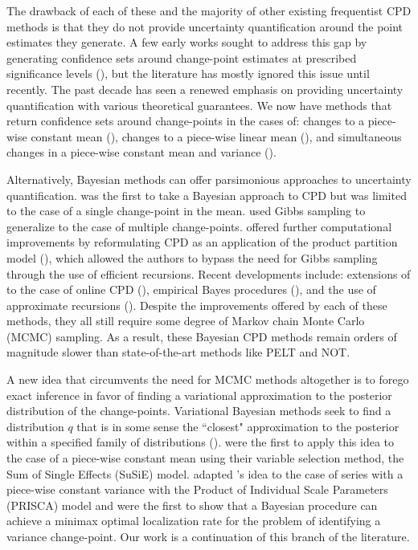 The drawback of each of these and the majority of other existing frequentist CPD methods is that they do not provide uncertainty quantification around the point estimates they generate. A few early works sought to address this gap by generating confidence sets around change-point estimates at prescribed significance levels (\citealp{Worsley86, Siegmund86, Bai03}), but the literature has mostly ignored this issue until recently. The past decade has seen a renewed emphasis on providing uncertainty quantification with various theoretical guarantees. We now have methods that return confidence sets around change-points in the cases of: changes to a piece-wise constant mean (\citealp{Frick14, Fang20, Jewell22}), changes to a piece-wise linear mean (\citealp{Fryzlewicz23}), and simultaneous changes in a piece-wise constant mean and variance (\citealp{Bai10, Pein17, Eichinger18}). 

Alternatively, Bayesian methods can offer parsimonious approaches to uncertainty quantification. \cite{Smith75} was the first to take a Bayesian approach to CPD but was limited to the case of a single change-point in the mean. \cite{Stephens94} used Gibbs sampling to generalize to the case of multiple change-points. \cite{Barry93} offered further computational improvements by reformulating CPD as an application of the product partition model (\citealp{Hartigan90, Barry92}), which allowed the authors to bypass the need for Gibbs sampling through the use of efficient recursions. Recent developments include: extensions of \cite{Barry93} to the case of online CPD (\citealp{Fearnhead06, Adams07}), empirical Bayes procedures (\citealp{Liu17}), and the use of approximate recursions (\citealp{Cappello21}). Despite the improvements offered by each of these methods, they all still require some degree of Markov chain Monte Carlo (MCMC) sampling. As a result, these Bayesian CPD methods remain orders of magnitude slower than state-of-the-art methods like PELT and NOT.

A new idea that circumvents the need for MCMC methods altogether is to forego exact inference in favor of finding a variational approximation to the posterior distribution of the change-points. Variational Bayesian methods seek to find a distribution $q$ that is in some sense the ``closest" approximation to the posterior within a specified family of distributions (\citealp{Jordan99, Bishop06, Wainright08, Blei17}). \cite{Wang20} were the first to apply this idea to the case of a piece-wise constant mean using their variable selection method, the Sum of Single Effects (SuSiE) model. \cite{Cappello22} adapted \citeauthor{Wang20}'s idea to the case of series with a piece-wise constant variance with the Product of Individual Scale Parameters (PRISCA) model and were the first to show that a Bayesian procedure can achieve a minimax optimal localization rate for the problem of identifying a variance change-point. Our work is a continuation of this branch of the literature.

